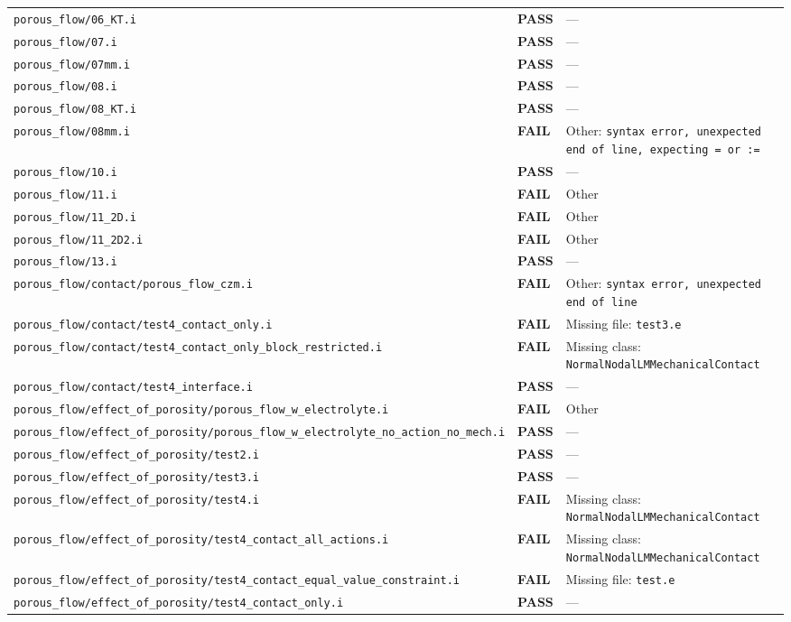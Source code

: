\documentclass[10pt,letterpaper]{article}
\newcommand{\PASS}{\textcolor{passgreen}{\textbf{PASS}}}
\newcommand{\FAIL}{\textcolor{failred}{\textbf{FAIL}}}
\newcommand{\code}[1]{\texttt{\small #1}}
\begin{document}
\begin{longtable}{p{} l p{}}
\code{porous\_flow/06\_KT.i} & \PASS & --- \\
\code{porous\_flow/07.i} & \PASS & --- \\
\code{porous\_flow/07mm.i} & \PASS & --- \\
\code{porous\_flow/08.i} & \PASS & --- \\
\code{porous\_flow/08\_KT.i} & \PASS & --- \\
\code{porous\_flow/08mm.i} & \FAIL & Other: \code{syntax error, unexpected end of line, expecting = or :=} \\
\code{porous\_flow/10.i} & \PASS & --- \\
\code{porous\_flow/11.i} & \FAIL & Other \\
\code{porous\_flow/11\_2D.i} & \FAIL & Other \\
\code{porous\_flow/11\_2D2.i} & \FAIL & Other \\
\code{porous\_flow/13.i} & \PASS & --- \\
\code{porous\_flow/contact/porous\_flow\_czm.i} & \FAIL & Other: \code{syntax error, unexpected end of line} \\
\code{porous\_flow/contact/test4\_contact\_only.i} & \FAIL & Missing file: \code{test3.e} \\
\code{porous\_flow/contact/test4\_contact\_only\_block\_restricted.i} & \FAIL & Missing class: \code{NormalNodalLMMechanicalContact} \\
\code{porous\_flow/contact/test4\_interface.i} & \PASS & --- \\
\code{porous\_flow/effect\_of\_porosity/porous\_flow\_w\_electrolyte.i} & \FAIL & Other \\
\code{porous\_flow/effect\_of\_porosity/porous\_flow\_w\_electrolyte\_no\_action\_no\_mech.i} & \PASS & --- \\
\code{porous\_flow/effect\_of\_porosity/test2.i} & \PASS & --- \\
\code{porous\_flow/effect\_of\_porosity/test3.i} & \PASS & --- \\
\code{porous\_flow/effect\_of\_porosity/test4.i} & \FAIL & Missing class: \code{NormalNodalLMMechanicalContact} \\
\code{porous\_flow/effect\_of\_porosity/test4\_contact\_all\_actions.i} & \FAIL & Missing class: \code{NormalNodalLMMechanicalContact} \\
\code{porous\_flow/effect\_of\_porosity/test4\_contact\_equal\_value\_constraint.i} & \FAIL & Missing file: \code{test.e} \\
\code{porous\_flow/effect\_of\_porosity/test4\_contact\_only.i} & \PASS & --- \\

\end{longtable}
\end{document}
